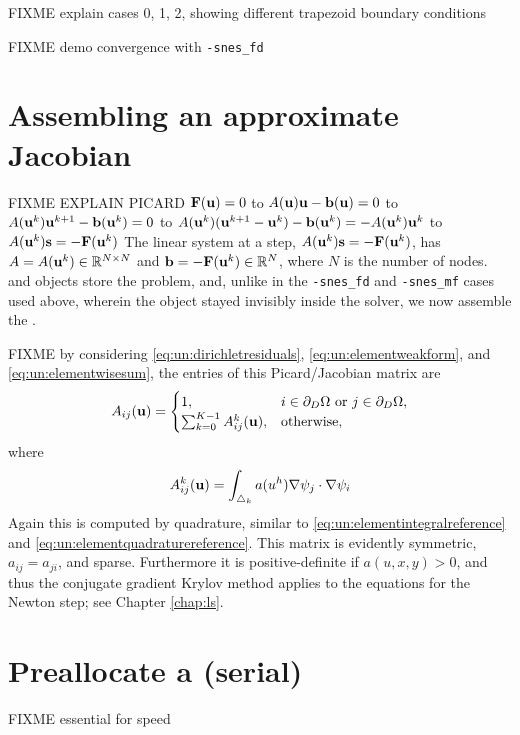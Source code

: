 FIXME explain cases 0, 1, 2, showing different trapezoid boundary conditions

FIXME demo convergence with \texttt{-snes\_fd}

\section{Assembling an approximate Jacobian}

FIXME EXPLAIN PICARD $\mathbf{F}(\mathbf{u})=0$ to $A(\mathbf{u}) \mathbf{u} - \mathbf{b}(\mathbf{u})=0$ to $A(\mathbf{u}^k) \mathbf{u}^{k+1} - \mathbf{b}(\mathbf{u}^k)=0$ to $A(\mathbf{u}^k) (\mathbf{u}^{k+1}-\mathbf{u}^k) - \mathbf{b}(\mathbf{u}^k)= - A(\mathbf{u}^k) \mathbf{u}^k$ to $A(\mathbf{u}^k) \mathbf{s} = -\mathbf{F}(\mathbf{u}^k)$  The linear system at a step, $A(\mathbf{u}^k) \mathbf{s} = -\mathbf{F}(\mathbf{u}^k)$, has $A=A(\mathbf{u}^k)\in\mathbb{R}^{N\times N}$ and $\mathbf{b}=-\mathbf{F}(\mathbf{u}^k)\in\mathbb{R}^N$, where $N$ is the number of nodes.  \pMat and \pVec objects store the problem, and, unlike in the \texttt{-snes\_fd} and \texttt{-snes\_mf} cases used above, wherein the \pMat object stayed invisibly inside the \pSNES solver, we now assemble the \pMat.

FIXME by considering \eqref{eq:un:dirichletresiduals}, \eqref{eq:un:elementweakform}, and \eqref{eq:un:elementwisesum}, the entries of this Picard/Jacobian matrix are
\begin{equation}
A_{ij}(\mathbf{u}) =  \begin{cases}
               1, & i \in \partial_D\Omega \text{ or } j \in \partial_D\Omega, \\
               \sum_{k=0}^{K-1} A_{ij}^k(\mathbf{u}), & \text{otherwise},
               \end{cases} \label{eq:un:picardentry}
\end{equation}
where
\begin{equation}
A_{ij}^k(\mathbf{u}) = \int_{\triangle_k} a(u^h) \nabla\psi_j \cdot \nabla\psi_i \label{eq:un:picardentryelement}
\end{equation}
Again this is computed by quadrature, similar to \eqref{eq:un:elementintegralreference} and \eqref{eq:un:elementquadraturereference}.  This matrix is evidently symmetric, $a_{ij}=a_{ji}$, and sparse.  Furthermore it is positive-definite if $a(u,x,y)>0$, and thus the conjugate gradient Krylov method applies to the equations for the Newton step; see Chapter \ref{chap:ls}.

\section{Preallocate a \pMat (serial)}

FIXME essential for speed

